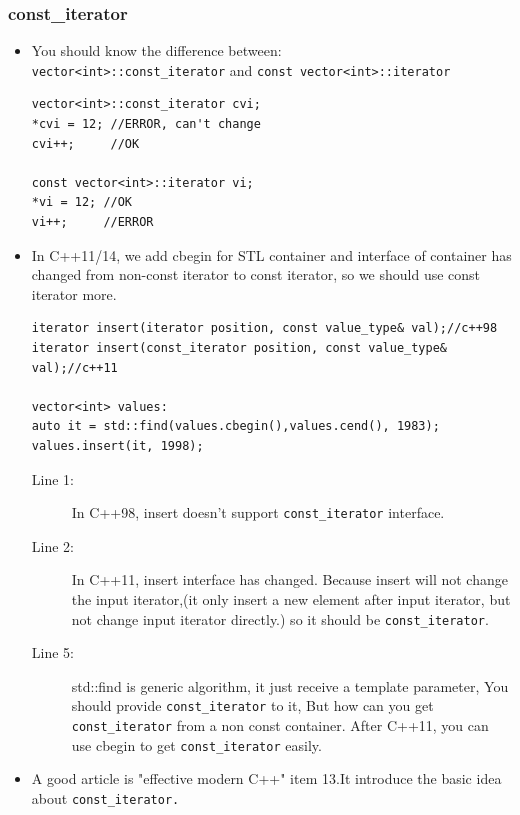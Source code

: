 \documentclass[a4paper,11pt,twoside]{book}
\begin{document}
\subsubsection{const\_iterator}
\begin{itemize}
	\item You should know the difference between: \\
	\texttt{vector<int>::const\_iterator} and \texttt{const vector<int>::iterator}
\begin{lstlisting}[numbers=none]
vector<int>::const_iterator cvi;
*cvi = 12; //ERROR, can't change
cvi++;     //OK
	
const vector<int>::iterator vi;
*vi = 12; //OK
vi++;     //ERROR
\end{lstlisting}
	
	\item In C++11/14, we add cbegin for STL container and interface of container has changed from non-const iterator to const iterator, so we should use const iterator more. 
\begin{lstlisting}
iterator insert(iterator position, const value_type& val);//c++98
iterator insert(const_iterator position, const value_type& val);//c++11
	
vector<int> values:
auto it = std::find(values.cbegin(),values.cend(), 1983);
values.insert(it, 1998);
\end{lstlisting}
\begin{description}
	\item[Line 1:] In C++98, insert doesn't support \texttt{const\_iterator} interface.
	
	\item[Line 2:] In C++11, insert interface has changed. Because insert will not change the input iterator,(it only insert a new element after input iterator, but not change input iterator directly.) so it should be \texttt{const\_iterator}.
	
	\item[Line 5:] std::find is generic algorithm, it just receive a template parameter,  You should provide \texttt{const\_iterator} to it, But how can you get \texttt{const\_iterator} from a non const container. After C++11, you can use cbegin to get \texttt{const\_iterator} easily.
\end{description}

	\item A good article is "effective modern C++" item 13.It introduce the basic idea about \texttt{const\_iterator.}
\end{itemize}
\end{document}
